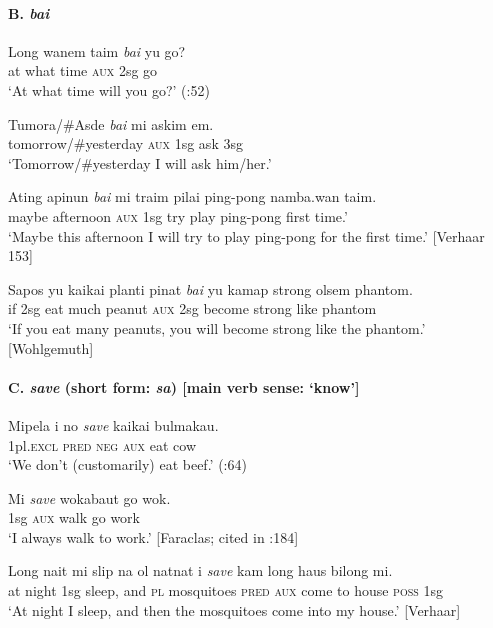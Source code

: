 \paragraph{B. \textit{bai}}
\ea
\gll Long  wanem  taim  \textit{bai}  yu  go?\\
at  what  time  \textsc{aux}  2sg  go\\
\glt ‘At what time will you go?’  (\citealt{Dutton1973}:52)
\z

\ea
\gll Tumora/\#Asde  \textit{bai}  mi  askim  em.\\
tomorrow/\#yesterday  \textsc{aux}  1sg  ask  3sg\\
\glt ‘Tomorrow/\#yesterday I will ask him/her.’
\z

\ea
\gll Ating  apinun  \textit{bai}  mi  traim  pilai  ping-pong  namba.wan  taim.\\
maybe  afternoon  \textsc{aux}  1sg  try  play  ping-pong  first  time.’\\
\glt ‘Maybe this afternoon I will try to play ping-pong for the first time.’  [Verhaar 153]
\z

\ea
\gll   Sapos  yu  kaikai  planti  pinat  \textit{bai}  yu  kamap  strong  olsem  phantom.\\
if  2sg  eat  much  peanut  \textsc{aux}  2sg  become  strong  like  phantom\\
\glt ‘If you eat many peanuts, you will become strong like the phantom.’ [Wohlgemuth]
\z

\paragraph{C. \textit{save} (short form: \textit{sa})  [main verb sense: ‘know’]}
\ea
\gll Mipela  i  no  \textit{save}  kaikai  bulmakau.\\
1pl.\textsc{excl}  \textsc{pred}  \textsc{neg}  \textsc{aux}  eat  cow\\
\glt ‘We don’t (customarily) eat beef.’  (\citealt{Dutton1973}:64)
\z

\ea
\gll Mi  \textit{save}  wokabaut  go  wok.\\
1sg  \textsc{aux}  walk  go  work\\
\glt ‘I always walk to work.’  [Faraclas; cited in \citealt{Holm2000}:184]
\z

\ea
\gll  Long  nait  mi  slip  na  ol  natnat  i  \textit{save}  kam  long  haus  bilong  mi.\\
at  night  1sg  sleep,  and  \textsc{pl}  mosquitoes  \textsc{pred}  \textsc{aux}  come  to  house  \textsc{poss}  1sg\\
\glt ‘At night I sleep, and then the mosquitoes come into my house.’  [Verhaar]
\z


